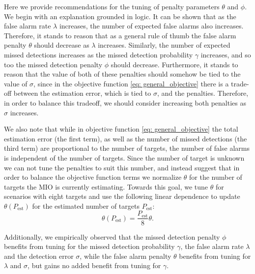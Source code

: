 Here we provide recommendations for the tuning of penalty parameters $\theta$ and $\phi$. We begin with an explanation grounded in logic. It can be shown that as the false alarm rate $\lambda$ increases, the number of expected false alarms also increases. Therefore, it stands to reason that as a general rule of thumb the false alarm penalty $\theta$ should decrease as $\lambda$ increases. Similarly, the number of expected missed detections increases as the missed detection probability $\gamma$ increases, and so too the missed detection penalty $\phi$ should decrease. Furthermore, it stands to reason that the value of both of these penalties should somehow be tied to the value of $\sigma$, since in the objective function \eqref{eq: general_objective} there is a trade-off between the estimation error, which is tied to $\sigma$, and the penalties. Therefore, in order to balance this tradeoff, we should consider increasing both penalties as $\sigma$ increases. 

We also note that while in objective function \eqref{eq: general_objective} the total estimation error (the first term), as well as the number of missed detections (the third term) are proportional to the number of targets, the number of false alarms is independent of the number of targets. Since the number of target is unknown we can not tune the penalties to suit this number, and instead suggest that in order to balance the objective function terms we normalize $\theta$ for the number of targets the MIO is currently estimating. Towards this goal, we tune $\theta$ for scenarios with eight targets and use the following linear dependence to update $\theta(P_{\text{est}})$ for the estimated number of targets $P_{\text{est}}$:
$$\theta(P_{\text{est}})=\frac{P_{\text{est}}}{8}\theta.$$

Additionally, we empirically observed that the missed detection penalty $\phi$ benefits from tuning for the missed detection probability $\gamma$, the false alarm rate $\lambda$ and the detection error $\sigma$, while the false alarm penalty $\theta$  benefits from tuning for $\lambda$ and $\sigma$, but gains no added benefit from tuning for $\gamma$. %

